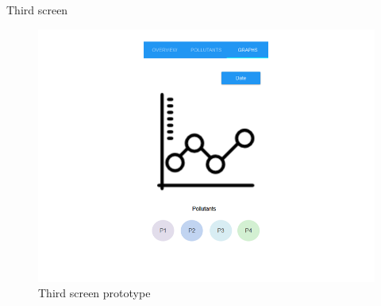 Third screen

\begin{figure}[H]
\begin{adjustbox}{width=1\textwidth,center=\textwidth}
  \centering
  \includegraphics[scale=1]{images/prototype1_screen3.png}
\end{adjustbox}
  \caption[Third screen prototype]{Third screen prototype}
  \label{fig:android_material_design}
\end{figure}
